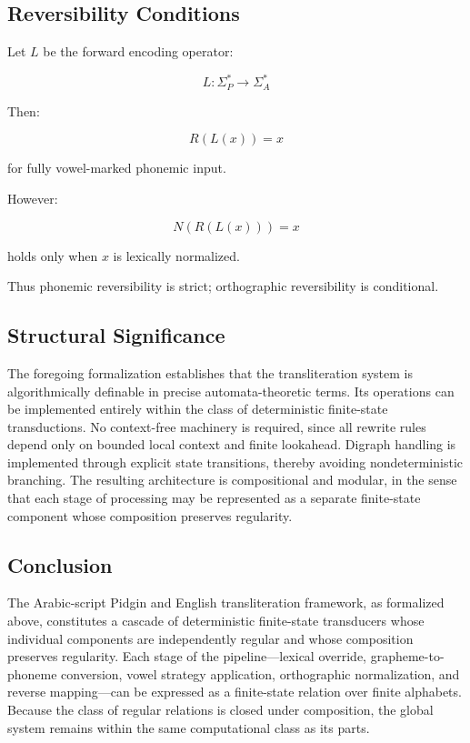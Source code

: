 \documentclass[12pt]{article}
\begin{document}
\subsection{Reversibility Conditions}

Let $L$ be the forward encoding operator:

\[
L : \Sigma_P^\ast \rightarrow \Sigma_A^\ast
\]

Then:

\[
R(L(x)) = x
\]

for fully vowel-marked phonemic input.

However:

\[
N(R(L(x))) = x
\]

holds only when $x$ is lexically normalized.

Thus phonemic reversibility is strict; orthographic reversibility is conditional.


\subsection{Structural Significance}

The foregoing formalization establishes that the transliteration system is algorithmically definable in precise automata-theoretic terms. Its operations can be implemented entirely within the class of deterministic finite-state transductions. No context-free machinery is required, since all rewrite rules depend only on bounded local context and finite lookahead. Digraph handling is implemented through explicit state transitions, thereby avoiding nondeterministic branching. The resulting architecture is compositional and modular, in the sense that each stage of processing may be represented as a separate finite-state component whose composition preserves regularity.

\subsection{Conclusion}

The Arabic-script Pidgin and English transliteration framework, as formalized above, constitutes a cascade of deterministic finite-state transducers whose individual components are independently regular and whose composition preserves regularity. Each stage of the pipeline—lexical override, grapheme-to-phoneme conversion, vowel strategy application, orthographic normalization, and reverse mapping—can be expressed as a finite-state relation over finite alphabets. Because the class of regular relations is closed under composition, the global system remains within the same computational class as its parts.
\end{document}
